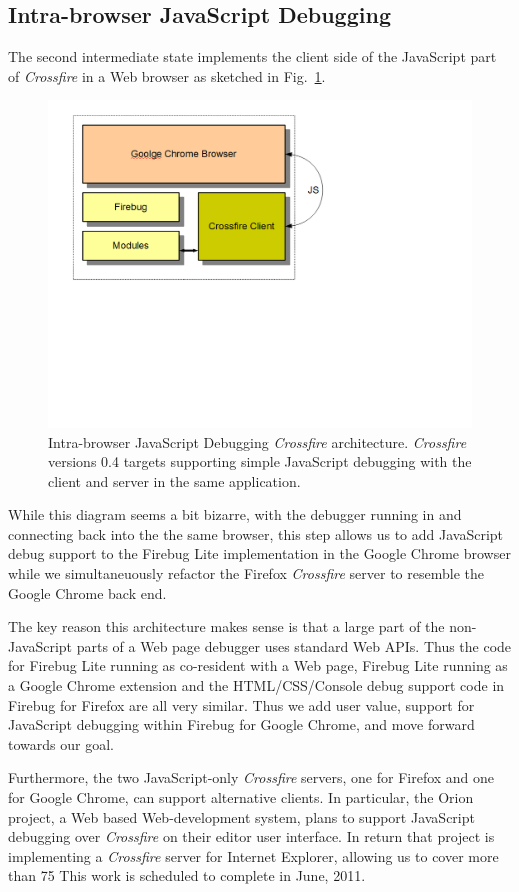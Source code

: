 \subsection{Intra-browser JavaScript Debugging}
The second intermediate state implements the client side of the JavaScript part of \textit{Crossfire} in 
a Web browser as sketched in Fig.~\ref{fig:fbugChrome}. 
\begin{figure}
  \includegraphics  [width = 86 mm] {figures/fbugChrome.png}
  \caption{Intra-browser JavaScript Debugging \textit{Crossfire} architecture. 
\textit{Crossfire} versions 0.4 targets supporting simple JavaScript debugging with the client and server in the same application.}
 \label{fig:fbugChrome}
\end{figure}
While this diagram seems a bit bizarre, with the 
debugger running in and connecting back into the the same browser, this step allows us to add JavaScript debug
support to the Firebug Lite implementation in the Google Chrome browser while we simultaneuously refactor 
the Firefox  \textit{Crossfire} server to resemble the Google Chrome back end.  

The key reason this architecture makes sense is that a large part of the non-JavaScript parts of a Web page
debugger uses standard Web APIs. Thus the code for Firebug Lite running as co-resident with a Web page, 
Firebug Lite running as a Google Chrome extension and the HTML/CSS/Console debug support code in Firebug 
for Firefox are all very similar.   Thus we add user value, support for JavaScript debugging within Firebug for Google Chrome, 
and move forward towards our goal.

Furthermore, the two JavaScript-only \textit{Crossfire} servers, one for Firefox and one for Google Chrome, can support 
alternative clients. In particular, the Orion project, a Web based Web-development system, plans to support 
JavaScript debugging over \textit{Crossfire} on their editor user interface. In return that project is implementing a \textit{Crossfire}
server for Internet Explorer, allowing us to cover more than 75%
This work is scheduled to complete in June, 2011.

